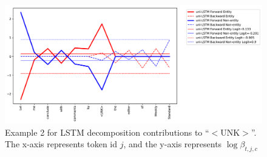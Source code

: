 \documentclass{article}
\begin{document}
\begin{figure}[t]
	\centering
	\includegraphics[width=\linewidth]{uni-UNK.pdf}
	\caption{Example 2 for LSTM decomposition contributions to ``$<$UNK$>$''. The x-axis represents token id $j$, and the y-axis represents $\log \beta_{t, j, c}$}
	\label{fig:unk}
\end{figure}



\end{document}
